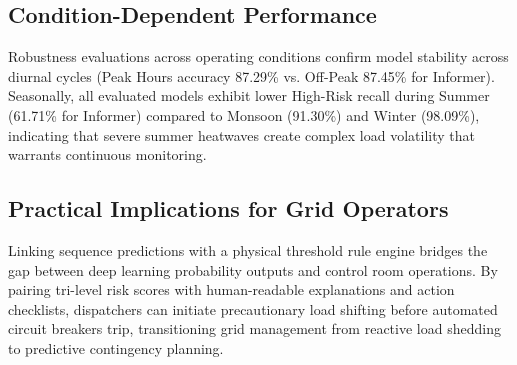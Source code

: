 \subsection{Condition-Dependent Performance}
Robustness evaluations across operating conditions confirm model stability across diurnal cycles (Peak Hours accuracy 87.29\% vs. Off-Peak 87.45\% for Informer). Seasonally, all evaluated models exhibit lower High-Risk recall during Summer (61.71\% for Informer) compared to Monsoon (91.30\%) and Winter (98.09\%), indicating that severe summer heatwaves create complex load volatility that warrants continuous monitoring.

\subsection{Practical Implications for Grid Operators}
Linking sequence predictions with a physical threshold rule engine bridges the gap between deep learning probability outputs and control room operations. By pairing tri-level risk scores with human-readable explanations and action checklists, dispatchers can initiate precautionary load shifting before automated circuit breakers trip, transitioning grid management from reactive load shedding to predictive contingency planning.
